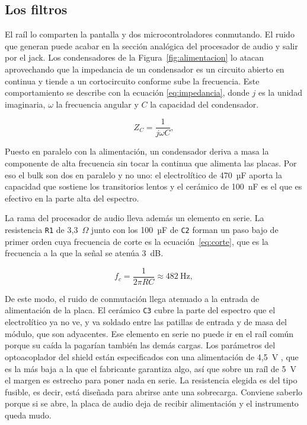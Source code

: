 \subsection*{Los filtros}

El raíl lo comparten la pantalla y dos microcontroladores conmutando. El ruido que
generan puede acabar en la sección analógica del procesador de audio y salir por el 
jack. Los condensadores de la Figura~\ref{fig:alimentacion} lo atacan aprovechando que
la impedancia de un condensador es un circuito abierto en continua y tiende a un cortocircuito
conforme sube la frecuencia. Este comportamiento se describe con la ecuación \eqref{eq:impedancia}, 
donde $j$ es la unidad imaginaria, $\omega$ la frecuencia angular y $C$ la capacidad del condensador.

\begin{equation}
    Z_C = \frac{1}{j\omega C},
    \label{eq:impedancia}
\end{equation}

Puesto en paralelo con la alimentación, un condensador deriva a
masa la componente de alta frecuencia sin tocar la continua que alimenta las
placas. Por eso el bulk son dos en paralelo y no uno: el electrolítico de
470~µF aporta la capacidad que sostiene los transitorios lentos y el cerámico
de 100~nF es el que es efectivo en la parte alta del espectro.

La rama del procesador de audio lleva además un elemento en serie. La resistencia
\texttt{R1} de 3,3~$\Omega$ junto con los 100~µF de \texttt{C2} forman un paso bajo 
de primer orden cuya frecuencia de corte es la ecuación~\eqref{eq:corte}, que es la 
frecuencia a la que la señal se atenúa 3~dB.

\begin{equation}
    f_c = \frac{1}{2\pi R C} \approx 482~\text{Hz},
    \label{eq:corte}
\end{equation}

De este modo, el ruido de conmutación llega atenuado a la entrada de alimentación 
de la placa. El cerámico \texttt{C3} cubre la parte del espectro que el electrolítico
ya no ve, y va soldado entre las patillas de entrada y de masa del módulo, que son 
adyacentes. Ese elemento en serie no puede ir en el raíl común porque su caída la 
pagarían también las demás cargas. Los parámetros del optoacoplador del shield
están especificados con una alimentación de 4,5~V \cite{Vishay6N138}, que es la
más baja a la que el fabricante garantiza algo, así que sobre un raíl de 5~V el
margen es estrecho para poner nada en serie.
La resistencia elegida es del tipo fusible, es decir, está diseñada para
abrirse ante una sobrecarga. Conviene saberlo porque si se abre, la placa de audio 
deja de recibir alimentación y el instrumento queda mudo.

